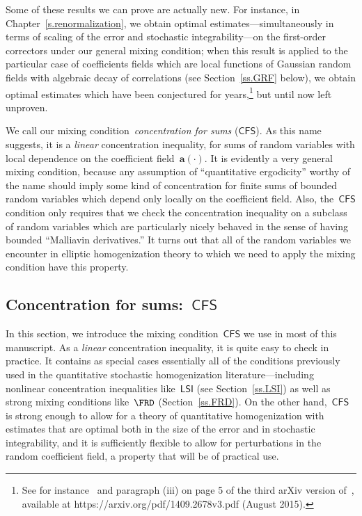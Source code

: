 \documentclass[11pt,twoside]{article} %
\numberwithin{equation}{section}
\theoremstyle{definition}
\renewcommand{\a}{\mathbf{a}}
\newcommand{\CFS}{\mathsf{CFS}}
\newcommand{\LSI}{\mathsf{LSI}}
\begin{document}
\smallskip

Some of these results we can prove are actually new. For instance, in Chapter~\ref{s.renormalization}, we obtain optimal estimates---simultaneously in terms of scaling of the error and stochastic integrability---on the first-order correctors under our general mixing condition; when this result is applied to the particular case of coefficients fields which are local functions of Gaussian random fields with algebraic decay of correlations (see Section~\ref{ss.GRF} below), we obtain optimal estimates which have been conjectured for years,\footnote{See for instance~\cite{GNO3} and paragraph (iii) on page 5 of the third arXiv version of~\cite{GNO2}, available at https://arxiv.org/pdf/1409.2678v3.pdf (August 2015).} but until now left unproven. 

\smallskip

We call our mixing condition~\emph{concentration for sums} ($\CFS$). As this name suggests, it is a \emph{linear} concentration inequality, for sums of random variables with local dependence on the coefficient field~$\a(\cdot)$. It is evidently a very general mixing condition, because any assumption of ``quantitative ergodicity'' worthy of the name should imply some kind of concentration for finite sums of bounded random variables which depend only locally on the coefficient field. Also, the~$\CFS$ condition only requires that we check the concentration inequality on a subclass of random variables which are particularly nicely behaved in the sense of having bounded ``Malliavin derivatives.'' It turns out that all of the random variables we encounter in elliptic homogenization theory to which we need to apply the mixing condition have this property. 

\subsection{Concentration for sums:~\texorpdfstring{$\CFS$}{{(CFS)}}}
\label{ss.CFS.intro}

In this section, we introduce the mixing condition~$\CFS$ we use in most of this manuscript. As a \emph{linear} concentration inequality, it is quite easy to check in practice. It contains as special cases essentially all of the conditions previously used in the quantitative stochastic homogenization literature---including nonlinear concentration inequalities like~$\LSI$ (see Section~\ref{ss.LSI}) as well as strong mixing conditions like~$\FRD$ (Section~\ref{ss.FRD}). On the other hand,~$\CFS$ is strong enough to allow for a theory of quantitative homogenization with estimates that are optimal both in the size of the error and in stochastic integrability, and it is sufficiently flexible to allow for perturbations in the random coefficient field, a property that will be of practical use. 
\end{document}
